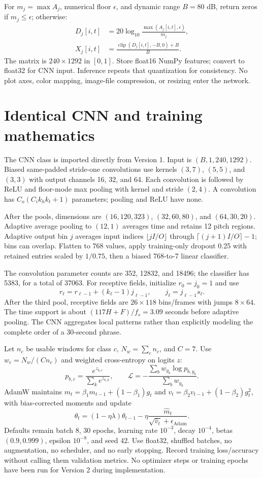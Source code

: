 \documentclass[11pt,a4paper]{article}
\begin{document}
For $m_j=\max A_j$, numerical floor $\epsilon$, and dynamic range $B=80$ dB,
return zeros if $m_j\le\epsilon$; otherwise:
\begin{align*}
D_j[i,t]&=20\log_{10}\frac{\max(A_j[i,t],\epsilon)}{m_j},\\
X_j[i,t]&=\frac{\operatorname{clip}(D_j[i,t],-B,0)+B}{B}.
\end{align*}
The matrix is $240\times1292$ in $[0,1]$. Store float16 NumPy features; convert to
float32 for CNN input. Inference repeats that quantization for consistency. No
plot axes, color mapping, image-file compression, or resizing enter the network.

\section{Identical CNN and training mathematics}
The CNN class is imported directly from Version 1. Input is $(B,1,240,1292)$.
Biased same-padded stride-one convolutions use kernels $(3,7)$, $(5,5)$, and
$(3,3)$ with output channels 16, 32, and 64. Each convolution is followed by ReLU
and floor-mode max pooling with kernel and stride $(2,4)$. A convolution has
$C_o(C_i k_h k_t+1)$ parameters; pooling and ReLU have none.

After the pools, dimensions are $(16,120,323)$, $(32,60,80)$, and $(64,30,20)$.
Adaptive average pooling to $(12,1)$ averages time and retains 12 pitch regions.
Adaptive output bin $j$ averages input indices
$\lfloor jI/O\rfloor$ through $\lceil(j+1)I/O\rceil-1$; bins can overlap.
Flatten to 768 values, apply training-only dropout 0.25 with retained entries
scaled by $1/0.75$, then a biased 768-to-7 linear classifier.

The convolution parameter counts are 352, 12832, and 18496; the classifier has
5383, for a total of 37063. For receptive fields, initialize $r_0=j_0=1$ and use
\[
r_\ell=r_{\ell-1}+(k_\ell-1)j_{\ell-1},\qquad
j_\ell=j_{\ell-1}s_\ell.
\]
After the third pool, receptive fields are $26\times118$ bins/frames with jumps
$8\times64$. The time support is about $(117H+F)/f_s=3.09$ seconds before
adaptive pooling. The CNN aggregates local patterns rather than explicitly
modeling the complete order of a 30-second phrase.

Let $n_c$ be usable windows for class $c$, $N_w=\sum_c n_c$, and $C=7$.
Use $w_c=N_w/(Cn_c)$ and weighted cross-entropy on logits $z$:
\[
p_{b,c}=\frac{e^{z_{b,c}}}{\sum_k e^{z_{b,k}}},\qquad
\mathcal L=-\frac{\sum_b w_{y_b}\log p_{b,y_b}}{\sum_b w_{y_b}}.
\]
AdamW maintains $m_t=\beta_1m_{t-1}+(1-\beta_1)g_t$ and
$v_t=\beta_2v_{t-1}+(1-\beta_2)g_t^2$, with bias-corrected moments and update
\[
\theta_t=(1-\eta\lambda)\theta_{t-1}
-\eta\frac{\widehat m_t}{\sqrt{\widehat v_t}+\epsilon_{\mathrm{Adam}}}.
\]
Defaults remain batch 8, 30 epochs, learning rate $10^{-3}$, decay $10^{-4}$,
betas $(0.9,0.999)$, epsilon $10^{-8}$, and seed 42. Use float32, shuffled
batches, no augmentation, no scheduler, and no early stopping. Record training
loss/accuracy without calling them validation metrics. No optimizer steps or
training epochs have been run for Version 2 during implementation.
\end{document}
